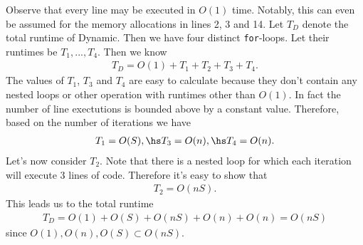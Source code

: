 \documentclass{article}
\begin{document}
Observe that every line may be executed in $O(1)$ time. Notably, this
can even be assumed for the memory allocations in lines 2, 3 and 14.
Let $T_D$ denote the total runtime of Dynamic. 
Then we have four distinct \texttt{for}-loops. Let their runtimes be 
$T_1, ..., T_4$. Then we know
\begin{align*}
    T_D = O(1) + T_1 + T_2 + T_3 + T_4.
\end{align*}
The values of $T_1$, $T_3$ and $T_4$ are easy to calculate because
they don't contain any nested loops or other operation with runtimes
other than $O(1)$. In fact the number of line exectutions is bounded
above by a constant value. Therefore, based on the number of
iterations we have
\begin{align*}
    T_1 = O(S),\hs T_3 = O(n),\hs T_4 = O(n).
\end{align*}
Let's now consider $T_2$. Note that there is a nested loop for which
each iteration will execute 3 lines of code. Therefore it's easy to show that
\begin{align*}
    T_2 = O(nS).
\end{align*}
This leads us to the total runtime
\begin{align*}
    T_D = O(1) + O(S) + O(nS) + O(n) + O(n) = O(nS)
\end{align*}
since $O(1),O(n),O(S)\subset O(nS)$.
\end{document}
